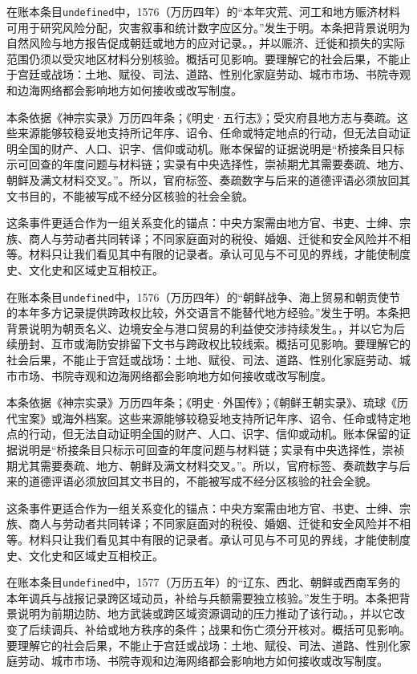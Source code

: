 在账本条目\texttt{undefined}中，1576（万历四年）的“本年灾荒、河工和地方赈济材料可用于研究风险分配，灾害叙事和统计数字应区分。”发生于明。本条把背景说明为自然风险与地方报告促成朝廷或地方的应对记录。，并以赈济、迁徙和损失的实际范围仍须以受灾地区材料分别核验。概括可见影响。要理解它的社会后果，不能止于宫廷或战场：土地、赋役、司法、道路、性别化家庭劳动、城市市场、书院寺观和边海网络都会影响地方如何接收或改写制度。

本条依据《神宗实录》万历四年条；《明史·五行志》；受灾府县地方志与奏疏。这些来源能够较稳妥地支持所记年序、诏令、任命或特定地点的行动，但无法自动证明全国的财产、人口、识字、信仰或动机。账本保留的证据说明是“桥接条目只标示可回查的年度问题与材料链；实录有中央选择性，崇祯期尤其需要奏疏、地方、朝鲜及满文材料交叉。”。所以，官府标签、奏疏数字与后来的道德评语必须放回其文书目的，不能被写成不经分区核验的社会全貌。

这条事件更适合作为一组关系变化的锚点：中央方案需由地方官、书吏、士绅、宗族、商人与劳动者共同转译；不同家庭面对的税役、婚姻、迁徙和安全风险并不相等。材料只让我们看见其中有限的记录者。承认可见与不可见的界线，才能使制度史、文化史和区域史互相校正。

在账本条目\texttt{undefined}中，1576（万历四年）的“朝鲜战争、海上贸易和朝贡使节的本年多方记录提供跨政权比较，外交语言不能替代地方经验。”发生于明。本条把背景说明为朝贡名义、边境安全与港口贸易的利益使交涉持续发生。，并以它为后续册封、互市或海防安排留下文书与跨政权比较线索。概括可见影响。要理解它的社会后果，不能止于宫廷或战场：土地、赋役、司法、道路、性别化家庭劳动、城市市场、书院寺观和边海网络都会影响地方如何接收或改写制度。

本条依据《神宗实录》万历四年条；《明史·外国传》；《朝鲜王朝实录》、琉球《历代宝案》或海外档案。这些来源能够较稳妥地支持所记年序、诏令、任命或特定地点的行动，但无法自动证明全国的财产、人口、识字、信仰或动机。账本保留的证据说明是“桥接条目只标示可回查的年度问题与材料链；实录有中央选择性，崇祯期尤其需要奏疏、地方、朝鲜及满文材料交叉。”。所以，官府标签、奏疏数字与后来的道德评语必须放回其文书目的，不能被写成不经分区核验的社会全貌。

这条事件更适合作为一组关系变化的锚点：中央方案需由地方官、书吏、士绅、宗族、商人与劳动者共同转译；不同家庭面对的税役、婚姻、迁徙和安全风险并不相等。材料只让我们看见其中有限的记录者。承认可见与不可见的界线，才能使制度史、文化史和区域史互相校正。

在账本条目\texttt{undefined}中，1577（万历五年）的“辽东、西北、朝鲜或西南军务的本年调兵与战报记录跨区域动员，补给与兵额需要独立核验。”发生于明。本条把背景说明为前期边防、地方武装或跨区域资源调动的压力推动了该行动。，并以它改变了后续调兵、补给或地方秩序的条件；战果和伤亡须分开核对。概括可见影响。要理解它的社会后果，不能止于宫廷或战场：土地、赋役、司法、道路、性别化家庭劳动、城市市场、书院寺观和边海网络都会影响地方如何接收或改写制度。

